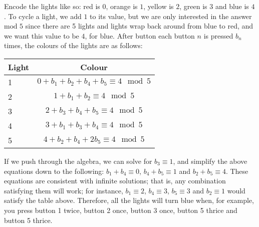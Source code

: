 
Encode the lights like so: red is $0$, orange is $1$, yellow is $2$, green is $3$ and blue is $4$. To cycle a light, we add $1$ to its value, but we are only interested in the answer $\text{mod } 5$ since there are 5 lights and lights wrap back around from blue to red, and we want this value to be $4$, for blue. After button each button $n$ is pressed $b_n$ times, the colours of the lights are as follows:

\begin{center}
\begin{tabular}{lc}
Light & Colour \\ \hline
1  & $0 + b_1 + b_2 + b_4 + b_5 \equiv 4 \mod 5$ \\
2  & $1 + b_1 + b_2 \equiv 4 \mod 5$ \\
3  & $2 + b_3 + b_4 + b_5 \equiv 4 \mod 5$ \\
4  & $3 + b_1 + b_3 + b_4 \equiv 4 \mod 5$ \\
5  & $4 + b_2 + b_4 + 2b_5 \equiv 4 \mod 5$ \\
\end{tabular}
\end{center}

If we push through the algebra, we can solve for $b_3 \equiv 1$, and simplify the above equations down to the following: $b_1 + b_4 \equiv 0$, $b_4 + b_5 \equiv 1$ and $b_2 + b_5 \equiv 4$. These equations are consistent with infinite solutions; that is, any combination satisfying them will work; for instance, $b_1 \equiv 2$, $b_4 \equiv 3$, $b_5 \equiv 3$ and $b_2 \equiv 1$ would satisfy the table above. Therefore, all the lights will turn blue when, for example, you press button 1 twice, button 2 once, button 3 once, button 5 thrice and button 5 thrice.


